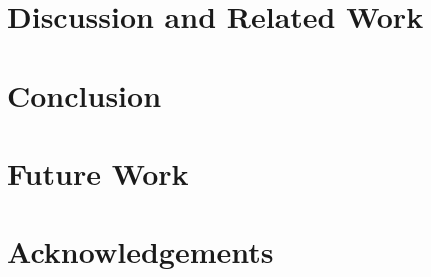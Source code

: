 \documentclass[conference]{IEEEtran}
\begin{document}

\section{Discussion and Related Work}




\section{Conclusion}


\section{Future Work}


\section{Acknowledgements}
\end{document}
